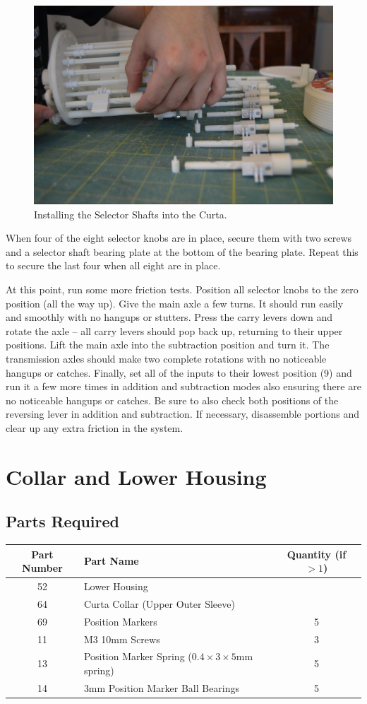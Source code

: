 \documentclass[openany]{book}
\begin{document}
\begin{figure}[!ht]
	\centering
	\includegraphics[width=.75\textwidth]{images/image33.jpg}
	\caption{Installing the Selector Shafts into the Curta.}
	\label{fig:image33}	
\end{figure}

When four of the eight selector knobs are in place, secure them with two screws and a selector shaft bearing plate at the bottom of the bearing plate. Repeat this to secure the last four when all eight are in place.

At this point, run some more friction tests. Position all selector knobs to the zero position (all the way up). Give the main axle a few turns. It should run easily and smoothly with no hangups or stutters. Press the carry levers down and rotate the axle -- all carry levers should pop back up, returning to their upper positions. Lift the main axle into the subtraction position and turn it. The transmission axles should make two complete rotations with no noticeable hangups or catches. Finally, set all of the inputs to their lowest position (9) and run it a few more times in addition and subtraction modes also ensuring there are no noticeable hangups or catches. Be sure to also check both positions of the reversing lever in addition and subtraction. If necessary, disassemble portions and clear up any extra friction in the system.



\chapter{Collar and Lower Housing}
\section{Parts Required}
\begin{table}[!ht]
	\centering
	\begin{tabular}{clc}
		Part Number & Part Name & Quantity (if $>1$) \\ \hline
		52 & Lower Housing & \\
		64 & Curta Collar (Upper Outer Sleeve) & \\
		69 & Position Markers & 5 \\ \hline \hline
		11 & M3 10mm Screws & 3 \\
		13 & Position Marker Spring ($0.4\times3\times5$mm spring) & 5 \\
		14 & 3mm Position Marker Ball Bearings & 5 
	\end{tabular}
\end{table}
\end{document}
